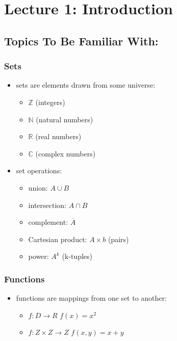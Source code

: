 \documentclass[11pt,a4paper]{article}
\begin{document}
\tableofcontents



\section{Lecture 1: Introduction}
\subsection{Topics To Be Familiar With:}
\subsubsection{Sets}
\begin{itemize}
    \item sets are elements drawn from some universe:
    \begin{itemize}
        \item $\mathbb{Z}$ (integers)
        \item $\mathbb{N}$ (natural numbers)
        \item $\mathbb{R}$ (real numbers)
        \item $\mathbb{C}$ (complex numbers)
    \end{itemize}
    \item set operations:
    \begin{itemize}
        \item union: $A \cup B$
        \item intersection: $A \cap B$
        \item complement: $\overline{A}$
        \item Cartesian product: $A \times b$ (pairs)
        \item power: $A^k$ (k-tuples)
    \end{itemize}
\end{itemize}

\subsubsection{Functions}
\begin{itemize}
    \item functions are mappings from one set to another:
    \begin{itemize}
        \item $f: D \rightarrow R$
        \subitem $f(x) = x^2$
        \item $f: Z \times Z \rightarrow Z $
        \subitem $f(x,y) = x + y$
    \end{itemize}
\end{itemize}
\end{document}
